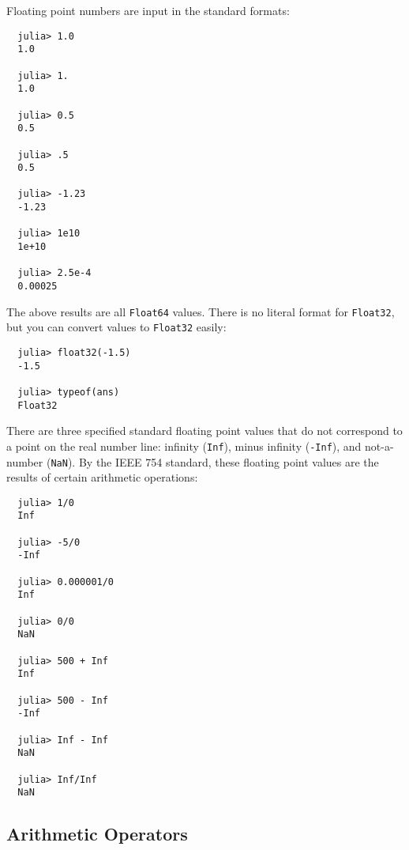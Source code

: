 \documentclass{article}
\renewcommand{\sec}[1]{\label{sec:#1}}
\begin{document}
Floating point numbers are input in the standard formats:
\begin{verbatim}
  julia> 1.0
  1.0

  julia> 1.
  1.0

  julia> 0.5
  0.5

  julia> .5
  0.5

  julia> -1.23
  -1.23

  julia> 1e10
  1e+10

  julia> 2.5e-4
  0.00025
\end{verbatim}
The above results are all \verb|Float64| values. There is no literal format for \verb|Float32|, but you can convert values to \verb|Float32| easily:
\begin{verbatim}
  julia> float32(-1.5)
  -1.5

  julia> typeof(ans)
  Float32
\end{verbatim}
There are three specified standard floating point values that do not correspond to a point on the real number line: infinity (\verb|Inf|), minus infinity (\verb|-Inf|), and not-a-number (\verb|NaN|).
By the IEEE 754 standard, these floating point values are the results of certain arithmetic operations:
\begin{verbatim}
  julia> 1/0
  Inf

  julia> -5/0
  -Inf

  julia> 0.000001/0
  Inf

  julia> 0/0
  NaN

  julia> 500 + Inf
  Inf

  julia> 500 - Inf
  -Inf

  julia> Inf - Inf
  NaN

  julia> Inf/Inf
  NaN
\end{verbatim}

\subsection{Arithmetic Operators}\sec{arithmetic-operators}
\end{document}
